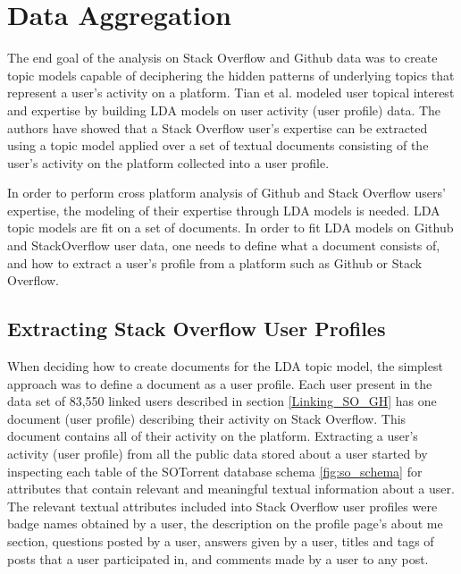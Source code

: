 \section{Data Aggregation} 
    The end goal of the analysis on Stack Overflow and Github data was to create topic models capable of deciphering the hidden patterns of underlying topics that represent a user's activity on a platform. Tian et al. \cite{tian2013predicting} modeled user topical interest and expertise by building LDA models on user activity (user profile) data. The authors have showed that a Stack Overflow user's expertise can be extracted using a topic model applied over a set of textual documents consisting of the user's activity on the platform collected into a user profile.

    In order to perform cross platform analysis of Github and Stack Overflow users' expertise, the modeling of their expertise through LDA models is needed. LDA topic models are fit on a set of documents. In order to fit LDA models on Github and StackOverflow user data, one needs to define what a document consists of, and how to extract a user's profile from a platform such as Github or Stack Overflow.  
    
    \subsection{Extracting Stack Overflow User Profiles\label{SO_userProfileExtraction}}
        When deciding how to create documents for the LDA topic model, the simplest approach was to define a document as a user profile. Each user present in the data set of 83,550 linked users described in section \ref{Linking_SO_GH} has one document (user profile) describing their activity on Stack Overflow. This document contains all of their activity on the platform. Extracting a user's activity (user profile) from all the public data stored about a user started by inspecting each table of the SOTorrent database schema \ref{fig:so_schema} for attributes that contain relevant and meaningful textual information about a user. The relevant textual attributes included into Stack Overflow user profiles were badge names obtained by a user, the description on the profile page's about me section, questions posted by a user, answers given by a user, titles and tags of posts that a user participated in, and comments made by a user to any post.
          
